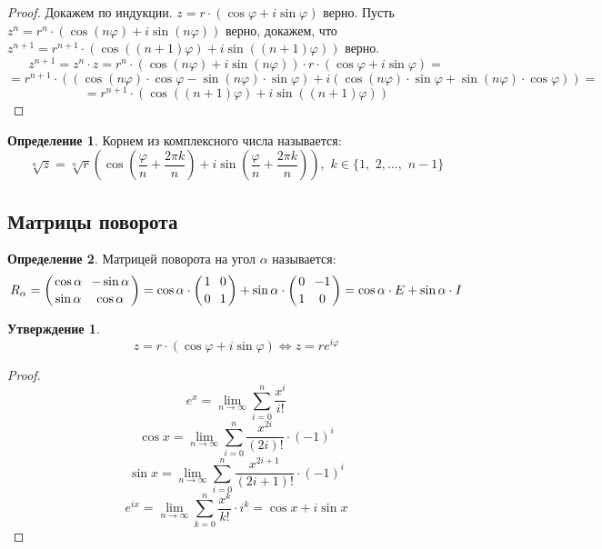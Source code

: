 \documentclass[12pt]{article}
\theoremstyle{definition}
\newtheorem{definition}{Определение}
\newtheorem{statement}[theorem]{Утверждение}
\begin{document}
    \begin{proof}
        Докажем по индукции. $z=r\cdot(\cos\varphi+ i\sin\varphi)$ верно. Пусть $z^n=r^n\cdot(\cos(n\varphi)+i\sin(n\varphi))$ верно, докажем, что $z^{n+1}=r^{n+1}\cdot(\cos((n+1)\varphi)+i\sin((n+1)\varphi))$ верно.
        $$z^{n+1}=z^n\cdot z=r^n\cdot(\cos(n\varphi)+i\sin(n\varphi))\cdot r\cdot(\cos\varphi+ i\sin\varphi)=$$
        $$=r^{n+1}\cdot((\cos(n\varphi)\cdot\cos\varphi-\sin(n\varphi)\cdot\sin\varphi)+i(\cos(n\varphi)\cdot\sin\varphi+\sin(n\varphi)\cdot\cos\varphi))=$$
        $$=r^{n+1}\cdot(\cos((n+1)\varphi)+i\sin((n+1)\varphi))$$
    \end{proof}
    \begin{definition}
        Корнем из комплексного числа называется:
        $$\sqrt[n]{z}=\sqrt[n]{r}\left(\cos\left(\frac{\varphi}{n}+\frac{2\pi k}{n}\right)+i\sin\left(\frac{\varphi}{n}+\frac{2\pi k}{n}\right)\right),\,\,k\in\{1,\,\,2,\ldots,\,\,n-1\}$$
    \end{definition}
    \subsection{Матрицы поворота}
    \begin{definition}
        Матрицей поворота на угол $\alpha$ называется:
        $$R_\alpha=\left({\cos \alpha \atop \sin \alpha}\,\,\, {-\sin \alpha \atop \cos \alpha}\right)=\cos \alpha \cdot \left({1 \atop 0}\,\,\, {0 \atop 1}\right)+\sin \alpha \cdot \left({0 \atop 1}\,\,\, {-1 \atop 0}\right)=\cos \alpha\cdot E+\sin\alpha\cdot I$$
    \end{definition}
    \begin{statement}
        $$z=r\cdot(\cos\varphi+ i\sin\varphi)\Longleftrightarrow z=re^{i\varphi}$$
    \end{statement}
    \begin{proof}
        $$e^x=\lim_{n\to\infty}\sum_{i=0}^n\dfrac{x^i}{i!}$$
        $$\cos x = \lim_{n\to\infty}\sum_{i=0}^n\dfrac{x^{2i}}{(2i)!}\cdot(-1)^i$$
        $$\sin x = \lim_{n\to\infty}\sum_{i=0}^n\dfrac{x^{2i+1}}{(2i+1)!}\cdot(-1)^i$$
        $$e^{ix}=\lim_{n\to\infty}\sum_{k=0}^n\dfrac{x^k}{k!}\cdot i^k=\cos x+ i\sin x$$
    \end{proof}
\end{document}
